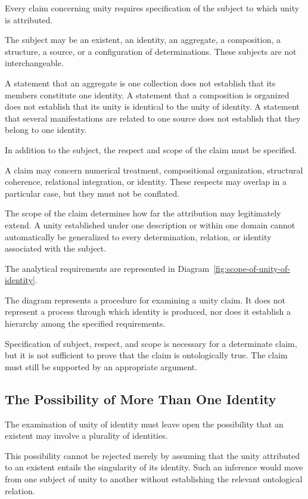 Every claim concerning unity requires specification
of the subject to which unity is attributed.

The subject may be an existent, an identity,
an aggregate, a composition, a structure,
a source, or a configuration of determinations.
These subjects are not interchangeable.

A statement that an aggregate is one collection
does not establish that its members constitute
one identity. A statement that a composition
is organized does not establish that its unity
is identical to the unity of identity. A statement
that several manifestations are related to
one source does not establish that they belong
to one identity.

In addition to the subject, the respect and
scope of the claim must be specified.

A claim may concern numerical treatment,
compositional organization, structural coherence,
relational integration, or identity. These respects
may overlap in a particular case, but they must
not be conflated.

The scope of the claim determines how far the
attribution may legitimately extend. A unity
established under one description or within
one domain cannot automatically be generalized
to every determination, relation, or identity
associated with the subject.

The analytical requirements are represented
in Diagram~\ref{fig:scope-of-unity-of-identity}.



The diagram represents a procedure for examining
a unity claim. It does not represent a process
through which identity is produced, nor does
it establish a hierarchy among the specified
requirements.

Specification of subject, respect, and scope
is necessary for a determinate claim, but it
is not sufficient to prove that the claim is
ontologically true. The claim must still be
supported by an appropriate argument.

\subsection{The Possibility of More Than One Identity}

The examination of unity of identity must leave
open the possibility that an existent may involve
a plurality of identities.

This possibility cannot be rejected merely by
assuming that the unity attributed to an existent
entails the singularity of its identity. Such
an inference would move from one subject of
unity to another without establishing the
relevant ontological relation.


